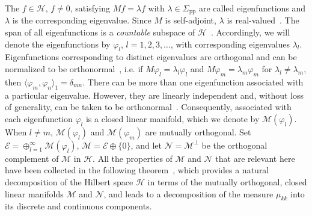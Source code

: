 \documentclass[leqno,onefignum,onetabnum]{siamltex1213}
\newcommand{\Sigp}{\Sigma_{\text{pp}}}
\newcommand{\Ec}{\mathcal{E}}
\newcommand{\Mc}{\mathcal{M}}
\newcommand{\Nc}{\mathcal{N}}
\newcommand{\Hs}{\mathscr{H}}
\newcommand\bnabla{\mbox{\boldmath${\nabla}$}}
\providecommand\bcdot{\boldsymbol{\cdot}}
\begin{document}
 The $f\in\Hs$, $f\neq0$, satisfying $Mf=\lambda
f$ with $\lambda\in\Sigp$ are called eigenfunctions and $\lambda$ is the
corresponding eigenvalue. Since $M$ is self-adjoint, $\lambda$ is
real-valued~\cite{Stone:64}. The
span of all eigenfunctions is a \emph{countable} subspace of
$\Hs$~\cite{Stone:64}. Accordingly, we will denote the
eigenfunctions by $\varphi_l$, $l=1,2,3,\ldots$, with corresponding eigenvalues
$\lambda_l$. Eigenfunctions corresponding to distinct eigenvalues
are orthogonal and can be normalized to be
orthonormal~\cite{Stone:64}, i.e. if $M\varphi_l=\lambda_l\varphi_l$ and $M\varphi_m=\lambda_m\varphi_m$
for $\lambda_l\neq\lambda_m$, then $\langle\varphi_m,\varphi_n\rangle_1=\delta_{mn}$.
There can be more than one eigenfunction associated with a particular
eigenvalue. However, they are linearly independent
and, without loss of generality, can be taken to be
orthonormal~\cite{Stone:64}. Consequently, associated with each
eigenfunction $\varphi_l$ is a closed linear manifold, which we denote by
$\Mc(\varphi_l)$. When $l\neq m$, $\Mc(\varphi_l)$ and $\Mc(\varphi_m)$ are mutually 
orthogonal. Set $\Ec=\oplus_{l=1}^\infty\Mc(\varphi_l)$, $\Mc=\Ec\oplus\{0\}$, and let
$\Nc=\Mc^\perp$ be the orthogonal complement of $\Mc$ in $\Hs$. All the
properties of $\Mc$ and $\Nc$ that are relevant here have been
collected in the following theorem~\cite{Stone:64}, which provides a
natural decomposition of the Hilbert space $\Hs$ in terms of the
mutually orthogonal, closed linear manifolds $\Mc$ and $\Nc$, and
leads to a decomposition of the measure $\mu_{kk}$ into its discrete and
continuous components. 
%
\end{document}
